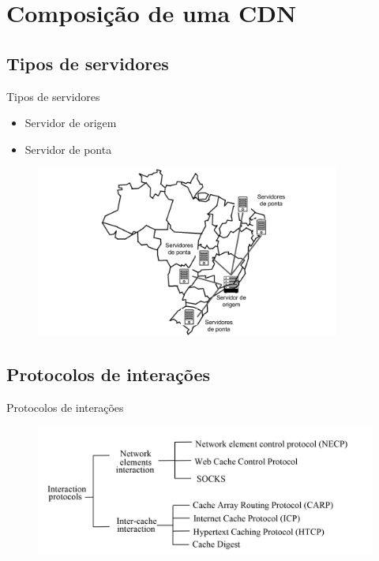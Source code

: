 \documentclass{beamer}
\begin{document}
\section{Composi\c{c}\~ao de uma CDN}

\subsection{Tipos de servidores}
\begin{frame}{Tipos de servidores}
\begin{itemize}
	\item Servidor de origem
	\item Servidor de ponta
\end{itemize}
\begin{figure} 
\includegraphics[width=10cm]{Figuras/tipos_servidores.png} 
\label{figura:tipos_servidores} 
\end{figure}
\end{frame}


\subsection{Protocolos de intera\c{c}\~oes}

\begin{frame}{Protocolos de intera\c{c}\~oes} 
\begin{figure} 
\includegraphics[width=13cm]{Figuras/tipos_relacionamentos.png} 
\label{figura:tipos_relacionamentos}
\end{figure}
\end{frame}
\end{document}
